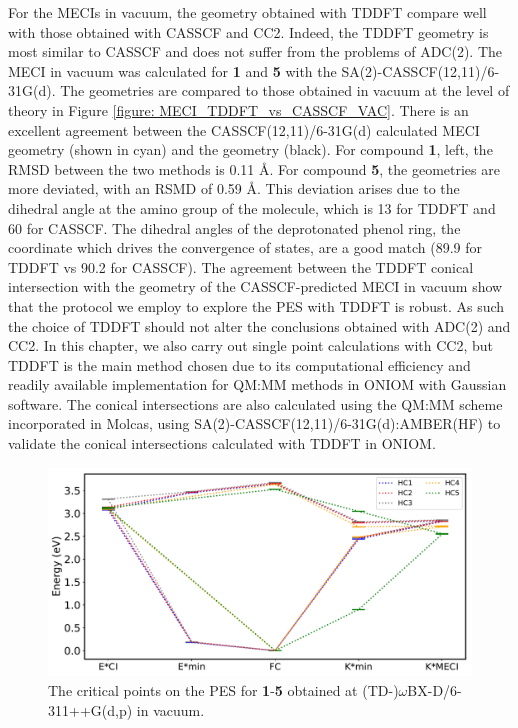 For the \ac{MECI}s in vacuum, the geometry obtained with TDDFT compare well with those obtained with CASSCF and CC2. Indeed, the TDDFT geometry is most similar to CASSCF and does not suffer from the problems of ADC(2). The \Kstar{} MECI in vacuum was calculated for \textbf{1} and \textbf{5} with the SA(2)-CASSCF(12,11)/6-31G(d). The geometries are compared to those obtained in vacuum at the {\highlevel} level of theory in Figure \ref{figure: MECI_TDDFT_vs_CASSCF_VAC}. There is an excellent agreement between the CASSCF(12,11)/6-31G(d) calculated MECI geometry (shown in cyan) and the {\highlevel} geometry (black). For compound \textbf{1}, left, the RMSD between the two methods is 0.11 \AA. For compound \textbf{5}, the geometries are more deviated, with an RSMD of 0.59 \AA. This deviation arises due to the dihedral angle at the amino group of the molecule, which is 13{\textdegree} for TDDFT and 60{\textdegree} for CASSCF. The dihedral angles of the deprotonated phenol ring, the coordinate which drives the convergence of states, are a good match (89.9{\textdegree} for TDDFT vs 90.2{\textdegree} for CASSCF). The agreement between the TDDFT \Kstar{} conical intersection with the geometry of the CASSCF-predicted MECI in vacuum show that the protocol we employ to explore the PES with TDDFT is robust. As such the choice of TDDFT should not alter the conclusions obtained with ADC(2) and CC2. In this chapter, we also carry out single point calculations with CC2, but TDDFT is the main method chosen due to its computational efficiency and readily available implementation for QM:MM methods in ONIOM with Gaussian software. The conical intersections are also calculated using the QM:MM scheme incorporated in Molcas, using SA(2)-CASSCF(12,11)/6-31G(d):AMBER(HF) to validate the conical intersections calculated with TDDFT in ONIOM.
\begin{figure}[t]
\centering
  \includegraphics[width=0.8\linewidth]{4IntraInterInteractions/2HC_energies_vac_TDDFT.pdf}
  \caption[The vacuum PES of \textbf{1}-\textbf{5} with TDDFT]{The critical points on the \ac{PES} for \textbf{1}-\textbf{5} obtained at (TD-)$\omega$BX-D/6-311++G(d,p) in vacuum.}
  \label{figure: HC_TDDFT_Vac}
\end{figure}

